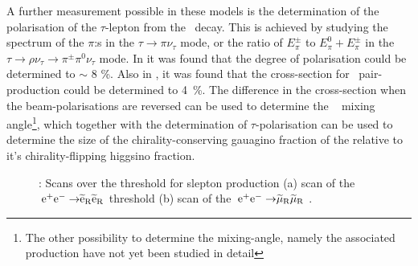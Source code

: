A further measurement possible in these models is the determination of the
polarisation of the $\tau$-lepton from the \stone~decay.
This is achieved by studying the spectrum of the $\pi$:s in
the $\tau \rightarrow \pi \nu_\tau$ mode, or the ratio of
$E_\pi^\pm$ to $E_\pi^0 + E_\pi^\pm$ in the  $\tau \rightarrow \rho \nu_\tau \rightarrow \pi^\pm \pi^0 \nu_\tau $ mode.
In \cite{Bechtle:2009em} it was found that
the degree of polarisation could be determined to $\sim$ 8 \%.
Also in \cite{Bechtle:2009em},
it was found that the cross-section for \stone~pair-production could be determined to 4~\%.
The difference in the cross-section when the beam-polarisations are
reversed can be used to determine the \stau~ mixing angle\footnote{The other
possibility to determine the mixing-angle, namely the \stone \sttwo associated production
have not yet been studied in detail},
which together with the determination of $\tau$-polarisation can be used to determine
the size of the chirality-conserving gauagino fraction of the  relative to it's
chirality-flipping higgsino fraction.
\begin{figure}[]
  \begin{center}
    \hspace{0.01\linewidth}
  \end{center}
  \caption{\label{fig:searches_smuselthreshold} : Scans over the threshold for slepton production
(a) scan of the $\mbox{$ {\, \mathrm e}^+ {\mathrm e}^- \to $} \mbox{$ \widetilde{\mathrm e}_{\mathrm R} $} \mbox{$ \widetilde{\mathrm e}_{\mathrm R} $}$ threshold  (b)  scan of the $\mbox{$ {\, \mathrm e}^+ {\mathrm e}^- \to $} \mbox{$ \widetilde{\mu}_{\mathrm R} $} \mbox{$ \widetilde{\mu}_{\mathrm R} $}$ \cite{Berggren:2015qua}. }
\end{figure}

